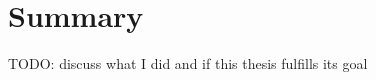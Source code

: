 \documentclass[
  digital, %
  twoside, %
  table,   %
  nolof,     %
  nolot,     %
]{fithesis3}
\begin{document}
\chapter{Summary}
TODO: discuss what I did and if this thesis fulfills its goal








\end{document}
